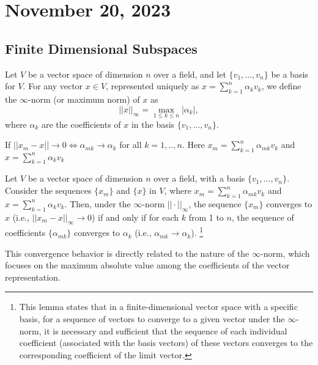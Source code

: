 \newpage
\section{November 20, 2023}
\subsection{Finite Dimensional Subspaces}
Let \( V \) be a vector space of dimension \( n \) over a field, and let \( \{v_1, \ldots, v_n\} \) be a basis for \( V \). For any vector \( x \in V \), represented uniquely as \( x = \sum_{k=1}^{n} \alpha_k v_k \), we define the \(\infty\)-norm (or maximum norm) of \( x \) as 
\[ ||x||_{\infty} = \max_{1 \leq k \leq n} |\alpha_k|, \]
where \( \alpha_k \) are the coefficients of \( x \) in the basis \( \{v_1, \ldots, v_n\} \).

\begin{lemma}
    If $||x_m - x|| \to 0 \iff \alpha_{mk} \to \alpha_k$
    for all $k=1, ..,n$. Here $x_m = \sum_{k=1}^{n}\alpha_{mk}v_k$ and $x = \sum_{k=1}^{n}\alpha_k v_k$
\end{lemma}


\begin{lemma}
    Let \( V \) be a vector space of dimension \( n \) over a field, with a basis \( \{v_1, \ldots, v_n\} \). Consider the sequences \( \{x_m\} \) and \( \{x\} \) in \( V \), where \( x_m = \sum_{k=1}^{n}\alpha_{mk}v_k \) and \( x = \sum_{k=1}^{n}\alpha_k v_k \). Then, under the \(\infty\)-norm \( ||\cdot||_{\infty} \), the sequence \( \{x_m\} \) converges to \( x \) (i.e., \( ||x_m - x||_{\infty} \to 0 \)) if and only if for each \( k \) from 1 to \( n \), the sequence of coefficients \( \{\alpha_{mk}\} \) converges to \( \alpha_k \) (i.e., \( \alpha_{mk} \to \alpha_k \)).
    \footnote{This lemma states that in a finite-dimensional vector space with a specific basis, for a sequence of vectors to converge to a given vector under the \(\infty\)-norm, it is necessary and sufficient that the sequence of each individual coefficient (associated with the basis vectors) of these vectors converges to the corresponding coefficient of the limit vector.}
\end{lemma}
This convergence behavior is directly related to the nature of the \(\infty\)-norm, which focuses on the maximum absolute value among the coefficients of the vector representation.

